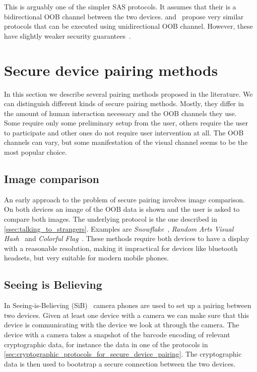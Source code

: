 \documentclass[conference, 11pt]{sty/IEEEtran}
\begin{document}
This is arguably one of the simpler SAS protocols.
It assumes that their is a bidirectional OOB channel between the two devices.
\cite{saxena2008automated} and~\cite{saxena2006secure} propose very similar protocols that can be executed using unidirectional OOB channel.
However, these have slightly weaker security guarantees~\cite{saxena2008automated}.

\section{Secure device pairing methods}
\label{sec:secure_device_pairing_methods}

In this section we describe several pairing methods proposed in the literature.
We can distinguish different kinds of secure pairing methods.
Mostly, they differ in the amount of human interaction necessary and the OOB channels they use.
Some require only some preliminary setup from the user, others require the user to participate and other ones do not require user intervention at all.
The OOB channels can vary, but some manifestation of the visual channel seems to be the most popular choice.


\subsection{Image comparison}
An early approach to the problem of secure pairing involves image comparison.
On both devices an image of the OOB data is shown and the user is asked to compare both images.
The underlying protocol is the one described in \autoref{ssec:talking_to_strangers}.
Examples are \textit{Snowflake}~\cite{goldberg1996visual}, \textit{Random Arts Visual Hash}~\cite{perrig1999hash} and \textit{Colorful Flag}~\cite{dohrmann2002public}.
These methods require both devices to have a display with a reasonable resolution, making it impractical for devices like bluetooth headsets, but very suitable for modern mobile phones.

\subsection{Seeing is Believing}
In Seeing-is-Believing (SiB)~\cite{mccune2005seeing} camera phones are used to set up a pairing between two devices.
Given at least one device with a camera we can make sure that this device is communicating with the device we look at through the camera.
The device with a camera takes a snapshot of the barcode encoding of relevant cryptographic data, for instance the data in one of the protocols in \autoref{sec:cryptographic_protocols_for_secure_device_pairing}.
The cryptographic data is then used to bootstrap a secure connection between the two devices.
\end{document}
